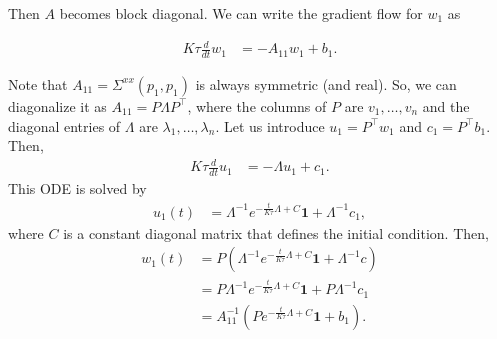 \documentclass{article}
\begin{document}
Then $A$ becomes block diagonal.
We can write the gradient flow for $w_1$ as

\begin{align}
  K \tau \frac{d}{dt} w_1 &= - A_{11} w_1 + b_1.
\end{align}

Note that $A_{11} = \Sigma^{xx}(p_1, p_1)$ is always symmetric (and real).
So, we can diagonalize it as $A_{11} = P \Lambda P^\top$, where the columns of $P$ are $v_1, \ldots, v_n$ and the diagonal entries of $\Lambda$ are $\lambda_1, \ldots, \lambda_n$.
Let us introduce $u_1 = P^\top w_1$ and $c_1 = P^\top b_1$.
Then,
\begin{align}
  K \tau \frac{d}{dt} u_1 &= - \Lambda u_1 + c_1. \label{eq:grad_flow_exclusive_reparam}
\end{align}
This ODE is solved by
\begin{align}
  u_1(t) &= \Lambda^{-1} e^{ -\frac{t}{K \tau} \Lambda + C } \mathbf{1} + \Lambda^{-1} c_1,
\end{align}
where $C$ is a constant diagonal matrix that defines the initial condition.
Then,
\begin{align}
  w_1(t) &= P \left( \Lambda^{-1} e^{ -\frac{t}{K \tau} \Lambda + C } \mathbf{1} + \Lambda^{-1} c \right) \\
  &= P \Lambda^{-1} e^{ -\frac{t}{K \tau} \Lambda + C } \mathbf{1} + P \Lambda^{-1} c_1 \\
  &= A_{11}^{-1} \left( P e^{ -\frac{t}{K \tau} \Lambda + C } \mathbf{1} + b_1 \right).
\end{align}
\end{document}
